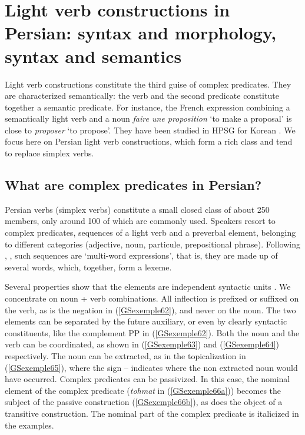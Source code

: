 \documentclass[output=paper
                ,modfonts
                ,nonflat
	        ,collection
	        ,collectionchapter
	        ,collectiontoclongg
 	        ,biblatex
                ,babelshorthands
                ,newtxmath
                ,draftmode
                ,colorlinks, citecolor=brown
]{./langsci/langscibook}
\begin{document}
{\section{Light verb constructions in Persian: syntax and morphology, syntax and semantics}\label{GSsection5}

Light verb constructions constitute the third guise of complex predicates. They are characterized semantically: the verb and the second predicate constitute together a semantic predicate. For instance, the French expression combining a semantically light verb and a noun \emph{faire une proposition} `to make a proposal’ is close to \emph{proposer} `to propose’. They have been studied in HPSG for Korean \citep{Ryu:93, lee2001argument, choi2001mixed, Kim2016a-u}. We focus here on Persian light verb constructions, which form a rich class and tend to replace simplex verbs.   
    
\subsection{What are complex predicates in Persian?}\label{GSsection5.1}

Persian verbs (simplex verbs) constitute a small closed class of about 250 members, only around 100 of which are commonly used. Speakers resort to complex predicates, sequences of a light verb and a preverbal element, belonging to different categories (adjective, noun, particule, prepositional phrase). Following \cite{bonami2010persian}, \cite{pollet2012grammaire}, such sequences are `multi-word expressions', that is, they are made up of several words, which, together, form a lexeme. 

Several properties show that the elements are independent syntactic units \citep{Karimi-Doostan97a, Megerdoomian2002a, pollet2012grammaire}. We concentrate on noun + verb combinations. All inflection is prefixed or suffixed on the verb, as is the negation in (\ref{GSexemple62}), and never on the noun. The two elements can be separated by the future auxiliary, or even by clearly syntactic constituents, like the complement PP in (\ref{GSexemple62}). Both the noun and the verb can be coordinated, as shown in (\ref{GSexemple63}) and (\ref{GSexemple64}) respectively. The noun can be extracted, as in the topicalization in (\ref{GSexemple65}), where the sign -- indicates where the non extracted noun would have occurred. Complex predicates can be passivized. In this case, the nominal element of the complex predicate (\emph{tohmat} in (\ref{GSexemple66a})) becomes the subject of the passive construction (\ref{GSexemple66b}), as does the object of a transitive construction. The nominal part of the complex predicate is italicized in the examples.

}
\end{document}
